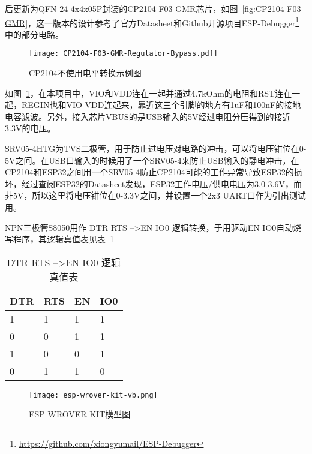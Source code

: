 后更新为QFN-24-4x4x05P封装的CP2104-F03-GMR芯片，如图~\ref{fig:CP2104-F03-GMR}，这一版本的设计参考了官方Datasheet和Github开源项目ESP-Debugger\footnote{\url{https://github.com/xiongyumail/ESP-Debugger}}中的部分电路。

\begin{figure}[htbp]
    \centering
    \texttt{[image: CP2104-F03-GMR-Regulator-Bypass.pdf]}
    \caption{CP2104不使用电平转换示例图}
    \label{fig:CP2104-Regulator-Bypass}
\end{figure}

如图~\ref{fig:CP2104-Regulator-Bypass}，在本项目中，VIO和VDD连在一起并通过4.7kOhm的电阻和RST连在一起，REGIN也和VIO VDD连起来，靠近这三个引脚的地方有1uF和100nF的接地电容滤波。另外，接入芯片VBUS的是USB输入的5V经过电阻分压得到的接近3.3V的电压。

SRV05-4HTG为TVS二极管，用于防止过电压对电路的冲击，可以将电压钳位在0-5V之间。在USB口输入的时候用了一个SRV05-4来防止USB输入的静电冲击，在CP2104和ESP32之间用一个SRV05-4防止CP2104可能的工作异常导致ESP32的损坏，经过查阅ESP32的Datasheet发现，ESP32工作电压/供电电压为3.0-3.6V，而非5V，所以这里将电压钳位在0-3.3V之间，并设置一个2x3 UART口作为引出测试用。

NPN三极管S8050用作 DTR RTS --\textgreater EN IO0 逻辑转换，于用驱动EN IO0自动烧写程序，其逻辑真值表见表~\ref{tab:LogicTab}

\begin{table}[]
    \centering
    \begin{tabular}{@{}llll@{}}
    \toprule
    DTR & RTS & EN & IO0 \\ \midrule
    1   & 1   & 1  & 1   \\
    0   & 0   & 1  & 1   \\
    1   & 0   & 0  & 1   \\
    0   & 1   & 1  & 0   \\ \bottomrule
    \end{tabular}
    \caption{DTR RTS --\textgreater EN IO0 逻辑真值表}
    \label{tab:LogicTab}
\end{table}


\begin{figure}[htbp]
    \centering
    \texttt{[image: esp-wrover-kit-vb.png]}
    \caption{ESP WROVER KIT模型图}
    \label{fig:ESP32-WROVER}
\end{figure}

